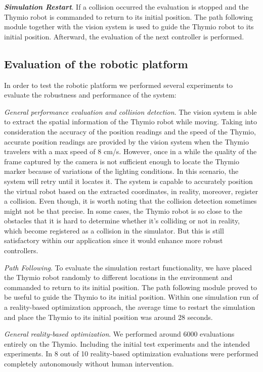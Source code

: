 \textbf{\emph{Simulation Restart}}. If a collision occurred the evaluation is stopped and the Thymio robot is commanded to return to its initial position. The path following module together with the vision system is used to guide the Thymio robot to its initial position. Afterward, the evaluation of the next controller is performed.


\subsection{Evaluation of the robotic platform}

In order to test the robotic platform we performed several experiments to evaluate the robustness and performance of the system:

\emph{General performance evaluation and collision detection}. The vision system is able to extract the spatial information of the Thymio robot while moving. Taking into consideration the accuracy of the position readings and the speed of the Thymio, accurate position readings are provided by the vision system when the Thymio travelers with a max speed of 8 cm/s. However, once in a while the quality of the frame captured by the camera is not sufficient enough to locate the Thymio marker because of variations of the lighting conditions. In this scenario, the system will retry until it locates it. The system is capable to accurately position the virtual robot based on the extracted coordinates, in reality, moreover, register a collision. Even though, it is worth noting that the collision detection sometimes might not be that precise. In some cases, the Thymio robot is so close to the obstacles that it is hard to determine whether it's colliding or not in reality, which become registered as a collision in the simulator. But this is still satisfactory within our application since it would enhance more robust controllers.

\emph{Path Following}. To evaluate the simulation restart functionality, we have placed the Thymio robot randomly to different locations in the environment and commanded to return to its initial position. The path following module proved to be useful to guide the Thymio to its initial position. Within one simulation run of a reality-based optimization approach, the average time to restart the simulation and place the Thymio to its initial position was around 28 seconds.

\emph{General reality-based optimization}. We performed around 6000 evaluations entirely on the Thymio. Including the initial test experiments and the intended experiments. In 8 out of 10 reality-based optimization evaluations were performed completely autonomously without human intervention.

